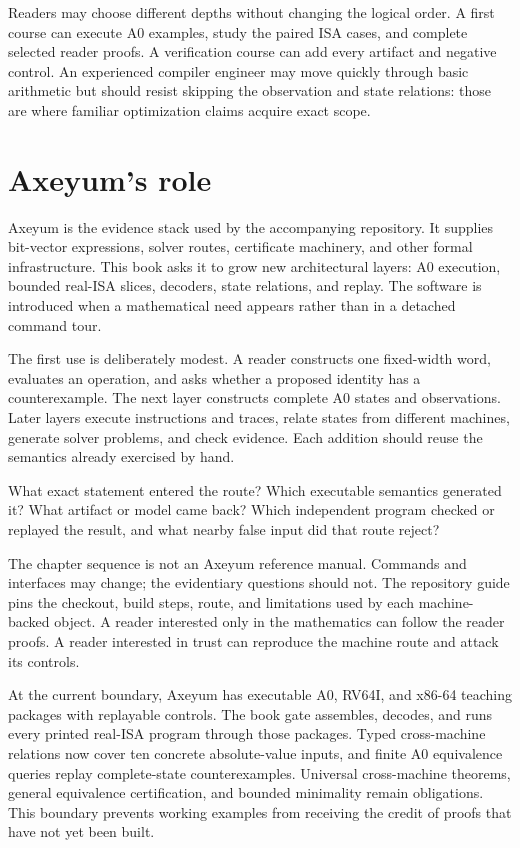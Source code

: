 Readers may choose different depths without changing the logical order. A
first course can execute A0 examples, study the paired ISA cases, and complete
selected reader proofs. A verification course can add every artifact and
negative control. An experienced compiler engineer may move quickly through
basic arithmetic but should resist skipping the observation and state
relations: those are where familiar optimization claims acquire exact scope.

\section{Axeyum's role}

Axeyum is the evidence stack used by the accompanying repository. It supplies
bit-vector expressions, solver routes, certificate machinery, and other
formal infrastructure. This book asks it to grow new architectural layers:
A0 execution, bounded real-ISA slices, decoders, state relations, and replay.
The software is introduced when a mathematical need appears rather than in a
detached command tour.

The first use is deliberately modest. A reader constructs one fixed-width
word, evaluates an operation, and asks whether a proposed identity has a
counterexample. The next layer constructs complete A0 states and observations.
Later layers execute instructions and traces, relate states from different
machines, generate solver problems, and check evidence. Each addition should
reuse the semantics already exercised by hand.

\begin{sidebar}[title={The four questions to ask of an Axeyum result}]
What exact statement entered the route? Which executable semantics generated
it? What artifact or model came back? Which independent program checked or
replayed the result, and what nearby false input did that route reject?
\end{sidebar}

The chapter sequence is not an Axeyum reference manual. Commands and interfaces may change;
the evidentiary questions should not. The repository guide pins the checkout,
build steps, route, and limitations used by each machine-backed object. A
reader interested only in the mathematics can follow the reader proofs. A
reader interested in trust can reproduce the machine route and attack its
controls.

At the current boundary, Axeyum has executable A0, RV64I, and x86-64 teaching
packages with replayable controls. The book gate assembles, decodes, and runs
every printed real-ISA program through those packages. Typed cross-machine
relations now cover ten concrete absolute-value inputs, and finite A0
equivalence queries replay complete-state counterexamples. Universal
cross-machine theorems, general equivalence certification, and bounded
minimality remain obligations. This boundary prevents working examples from receiving the credit
of proofs that have not yet been built.

